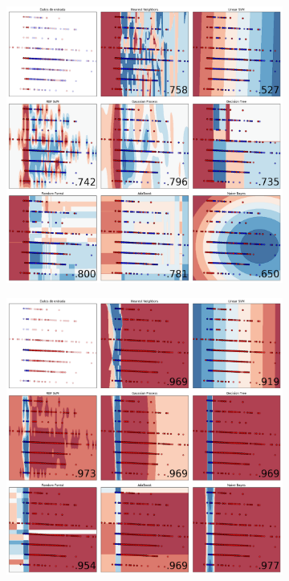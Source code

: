 \documentclass[5p,times]{elsarticle}
\begin{document}
\begin{figure}[H]
\centering
\begin{subfigure}[t]{0.3\textwidth}
\includegraphics[width=\textwidth]{10}
\caption{}
\end{subfigure}

\begin{subfigure}[t]{0.3\textwidth}
\includegraphics[width=\textwidth]{11}
\caption{}
\end{subfigure}


\end{figure}
\end{document}
